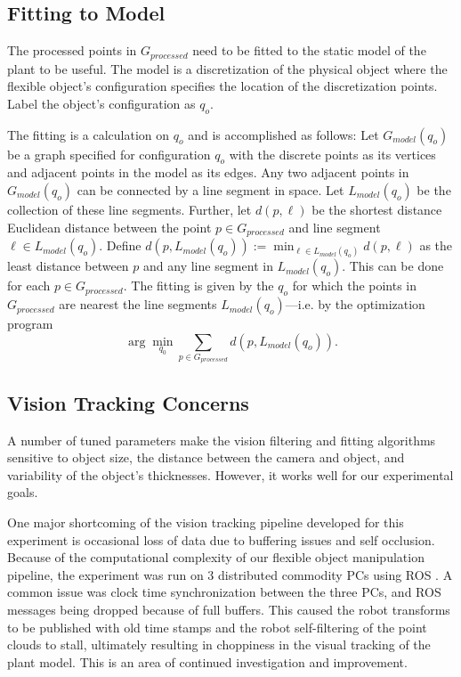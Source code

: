 \documentclass[runningheads,a4paper]{llncs}
\begin{document}
\subsection{Fitting to Model \label{sec-fit}}

The processed points in $G_{processed}$ need to be fitted to the static model of the plant to be useful. The model is a discretization of the physical object where the flexible object's configuration specifies the location of the discretization points. Label the object’s configuration as $q_o$. 

The fitting is a calculation on $q_o$ and is accomplished as follows: Let $G_{model}(q_o)$ be a graph specified for configuration $q_o$ with the discrete points as its vertices and adjacent points in the model as its edges. Any two adjacent points in $G_{model}(q_o)$ can be connected by a line segment in space. Let $L_{model}(q_o)$ be the collection of these line segments. Further, let $d(p,\ell)$ be the shortest distance Euclidean distance between the point $p\in G_{processed}$ and line segment $\ell \in L_{model}(q_o)$. Define $d(p,L_{model}(q_o)) := \min_{\ell\in L_{model}(q_o)} d(p,\ell)$ as the least distance between $p$ and any line segment in $L_{model}(q_o)$. This can be done for each $p\in G_{processed}$. The fitting is given by the $q_o$ for which the points in $G_{processed}$ are nearest the line segments $L_{model}(q_o)$---i.e. by the optimization program
\begin{equation}
\arg \min_{q_0} \sum_{p\in G_{processed}} d(p,L_{model}(q_o)).
\label{eq-fit_prog}
\end{equation}

\subsection{Vision Tracking Concerns \label{sec-vis_disc}}

A number of tuned parameters make the vision filtering and fitting algorithms sensitive to object size, the distance between the camera and object, and variability of the object's thicknesses. However, it works well for our experimental goals.

One major shortcoming of the vision tracking pipeline developed for this experiment is occasional loss of data due to buffering issues and self occlusion. Because of the computational complexity of our flexible object manipulation pipeline, the experiment was run on 3 distributed commodity PCs using ROS \cite{quigley2009ros}. A common issue was clock time synchronization between the three PCs, and ROS messages being dropped because of full buffers. This caused the robot transforms to be published with old time stamps and the robot self-filtering of the point clouds to stall, ultimately resulting in choppiness in the visual tracking of the plant model. This is an area of continued investigation and improvement. 
\end{document}
